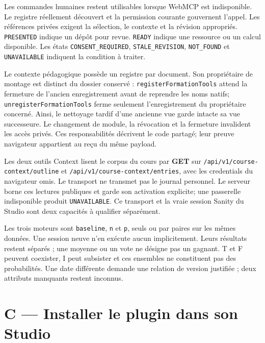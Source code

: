 \documentclass[
  canadien,
  11pt,
  a4paper,
]{report}
\begin{document}
Les commandes humaines restent utilisables lorsque WebMCP est
indisponible. Le registre réellement découvert et la permission courante
gouvernent l'appel. Les références privées exigent la sélection, le
contexte et la révision appropriés. \texttt{PRESENTED} indique un dépôt
pour revue. \texttt{READY} indique une ressource ou un calcul
disponible. Les états \texttt{CONSENT\_\allowbreak{}REQUIRED},
\texttt{STALE\_\allowbreak{}REVISION}, \texttt{NOT\_\allowbreak{}FOUND} et \texttt{UNAVAILABLE}
indiquent la condition à traiter.

Le contexte pédagogique possède un registre par document. Son
propriétaire de montage est distinct du dossier conservé :
\texttt{register\allowbreak{}Formation\allowbreak{}Tools} attend la fermeture de l'ancien
enregistrement avant de reprendre les noms natifs;
\texttt{unregister\allowbreak{}Formation\allowbreak{}Tools} ferme seulement l'enregistrement du
propriétaire concerné. Ainsi, le nettoyage tardif d'une ancienne vue
garde intacte sa vue successeure. Le changement de module, la révocation
et la fermeture invalident les accès privés. Ces responsabilités
décrivent le code partagé; leur preuve navigateur appartient au reçu du
même payload.

Les deux outils Context lisent le corpus du cours par \textbf{GET} sur
\texttt{/\allowbreak{}api/\allowbreak{}v1/\allowbreak{}course-context/\allowbreak{}outline} et
\texttt{/\allowbreak{}api/\allowbreak{}v1/\allowbreak{}course-context/\allowbreak{}entries}, avec les credentials du
navigateur omis. Le transport ne transmet pas le journal personnel. Le
serveur borne ces lectures publiques et garde son activation explicite;
une passerelle indisponible produit \texttt{UNAVAILABLE}. Ce transport
et la vraie session Sanity du Studio sont deux capacités à qualifier
séparément.

Les trois moteurs sont \texttt{baseline}, \texttt{n} et \texttt{p},
seuls ou par paires sur les mêmes données. Une session neuve n'en
exécute aucun implicitement. Leurs résultats restent séparés ; une
moyenne ou un vote ne désigne pas un gagnant. T et F peuvent coexister,
I peut subsister et ces ensembles ne constituent pas des probabilités.
Une date différente demande une relation de version justifiée ; deux
attributs manquants restent inconnus.

\section{C --- Installer le plugin dans son
Studio}\label{c-installer-le-plugin-dans-son-studio}
\end{document}
